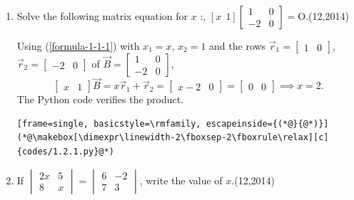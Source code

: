\begin{enumerate}[label={},font=\normalfont,leftmargin=1.15cm,labelwidth=1.0cm,labelsep=0.15cm,itemindent=0pt,listparindent=0pt,itemsep=\baselineskip,parsep=0pt,topsep=0pt]
\item[1.2.1] Solve the following matrix equation for $x$ :, $[x\ \ 1]\begin{bmatrix}1&0\\-2&0\end{bmatrix}=\mathrm{O}$.\nobreak\hfill\mbox{(12,2014)}



\vspace{0.6em}\par\solution

Using (\ref{formula-1-1-1}) with $x_1=x$, $x_2=1$ and the rows $\vec{r}_1=\begin{bmatrix}1&0\end{bmatrix}$, $\vec{r}_2=\begin{bmatrix}-2&0\end{bmatrix}$ of $\vec{B}=\begin{bmatrix}1&0\\-2&0\end{bmatrix}$,
\[
\begin{bmatrix}x&1\end{bmatrix}\vec{B}=x\vec{r}_1+\vec{r}_2=\begin{bmatrix}x-2&0\end{bmatrix}=\begin{bmatrix}0&0\end{bmatrix}\implies\boxed{x=2}.
\]
The Python code verifies the product.
\par\noindent\begin{minipage}{\linewidth}
\begin{lstlisting}[frame=single, basicstyle=\rmfamily, escapeinside={(*@}{@*)}]
(*@\makebox[\dimexpr\linewidth-2\fboxsep-2\fboxrule\relax][c]{codes/1.2.1.py}@*)
\end{lstlisting}
\end{minipage}\par

\item[1.2.2] If $\begin{vmatrix}2x&5\\8&x\end{vmatrix}=\begin{vmatrix}6&-2\\7&3\end{vmatrix}$, write the value of $x$.\nobreak\hfill\mbox{(12,2014)}




\end{enumerate}
